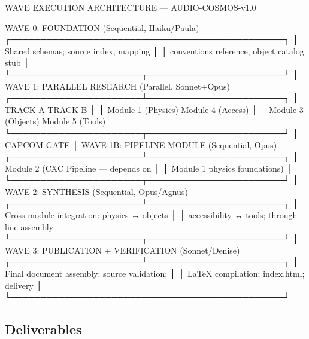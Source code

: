 \documentclass[11pt,letterpaper]{article}
\begin{document}
\begin{asciibox}
WAVE EXECUTION ARCHITECTURE — AUDIO-COSMOS-v1.0

 WAVE 0: FOUNDATION (Sequential, Haiku/Paula)
 ┌──────────────────────────────────────────────┐
 │ Shared schemas; source index; mapping         │
 │ conventions reference; object catalog stub    │
 └──────────────────────┬───────────────────────┘
                        │
 WAVE 1: PARALLEL RESEARCH (Parallel, Sonnet+Opus)
 ┌──────────────────────┴───────────────────────┐
 │   TRACK A                    TRACK B          │
 │  Module 1 (Physics)         Module 4 (Access) │
 │  Module 3 (Objects)         Module 5 (Tools)  │
 └──────────────────────┬───────────────────────┘
                        │
                   CAPCOM GATE
                        │
 WAVE 1B: PIPELINE MODULE (Sequential, Opus)
 ┌──────────────────────┴───────────────────────┐
 │   Module 2 (CXC Pipeline — depends on         │
 │   Module 1 physics foundations)               │
 └──────────────────────┬───────────────────────┘
                        │
 WAVE 2: SYNTHESIS (Sequential, Opus/Agnus)
 ┌──────────────────────┴───────────────────────┐
 │ Cross-module integration: physics ↔ objects   │
 │ accessibility ↔ tools; through-line assembly  │
 └──────────────────────┬───────────────────────┘
                        │
 WAVE 3: PUBLICATION + VERIFICATION (Sonnet/Denise)
 ┌──────────────────────┴───────────────────────┐
 │ Final document assembly; source validation;   │
 │ LaTeX compilation; index.html; delivery        │
 └──────────────────────────────────────────────┘
\end{asciibox}

\subsection{Deliverables}
\end{document}
